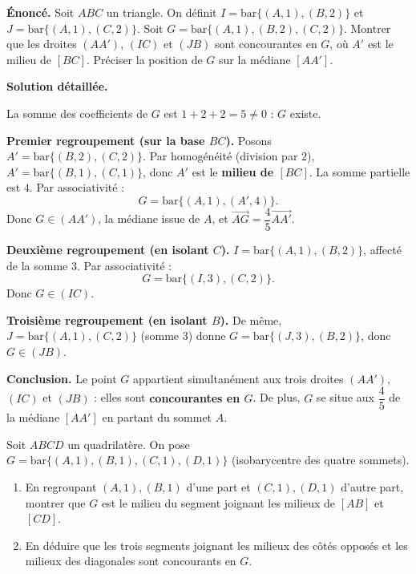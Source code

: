\documentclass[11pt]{article}
\begin{document}
\begin{exoresolu}
\textbf{Énoncé.} Soit $ABC$ un triangle. On définit $I = \mathrm{bar}\{(A,1),(B,2)\}$ et $J = \mathrm{bar}\{(A,1),(C,2)\}$. Soit $G = \mathrm{bar}\{(A,1),(B,2),(C,2)\}$.
Montrer que les droites $(AA')$, $(IC)$ et $(JB)$ sont concourantes en $G$, où $A'$ est le milieu de $[BC]$. Préciser la position de $G$ sur la médiane $[AA']$.

\tcblower
\textbf{Solution détaillée.}

La somme des coefficients de $G$ est $1+2+2 = 5 \neq 0$ : $G$ existe.

\textbf{Premier regroupement (sur la base $BC$).} Posons $A' = \mathrm{bar}\{(B,2),(C,2)\}$. Par homogénéité (division par $2$), $A' = \mathrm{bar}\{(B,1),(C,1)\}$, donc $A'$ est le \textbf{milieu de $[BC]$}. La somme partielle est $4$. Par associativité :
\[
G = \mathrm{bar}\{(A,1),(A',4)\}.
\]
Donc $G \in (AA')$, la médiane issue de $A$, et $\overrightarrow{AG} = \dfrac{4}{5}\overrightarrow{AA'}$.

\textbf{Deuxième regroupement (en isolant $C$).} $I = \mathrm{bar}\{(A,1),(B,2)\}$, affecté de la somme $3$. Par associativité :
\[
G = \mathrm{bar}\{(I,3),(C,2)\}.
\]
Donc $G \in (IC)$.

\textbf{Troisième regroupement (en isolant $B$).} De même, $J = \mathrm{bar}\{(A,1),(C,2)\}$ (somme $3$) donne $G = \mathrm{bar}\{(J,3),(B,2)\}$, donc $G \in (JB)$.

\textbf{Conclusion.} Le point $G$ appartient simultanément aux trois droites $(AA')$, $(IC)$ et $(JB)$ : elles sont \textbf{concourantes en $G$}. De plus, $G$ se situe aux $\dfrac{4}{5}$ de la médiane $[AA']$ en partant du sommet $A$.
\end{exoresolu}

\begin{exercice}
Soit $ABCD$ un quadrilatère. On pose $G = \mathrm{bar}\{(A,1),(B,1),(C,1),(D,1)\}$ (isobarycentre des quatre sommets).
\begin{enumerate}
\item En regroupant $(A,1),(B,1)$ d'une part et $(C,1),(D,1)$ d'autre part, montrer que $G$ est le milieu du segment joignant les milieux de $[AB]$ et $[CD]$.
\item En déduire que les trois segments joignant les milieux des côtés opposés et les milieux des diagonales sont concourants en $G$.
\end{enumerate}
\end{exercice}
\end{document}
